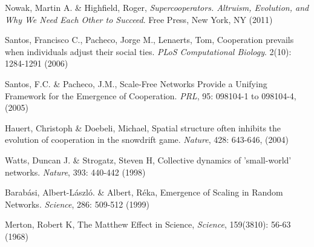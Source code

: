 \begin{thebibliography}{50}
 Nowak, Martin A. \& Highfield, Roger,
  \textit{Supercooperators. Altruism, Evolution, and Why We Need Each
    Other to Succeed}. Free Press, New York, NY  (2011)

 Santos, Francisco C., Pacheco, Jorge M., Lenaerts, Tom, Cooperation prevails when individuals adjust their social ties. \textit{PLoS Computational Biology}. 2(10): 1284-1291 (2006)

 Santos, F.C. \& Pacheco, J.M., Scale-Free
  Networks Provide a Unifying Framework for the Emergence of
  Cooperation. \textit{PRL}, 95: 098104-1 to 098104-4, (2005) 

 Hauert, Christoph \& Doebeli, Michael, Spatial
  structure often inhibits the evolution of cooperation in the
  snowdrift game. \textit{Nature}, 428: 643-646,  (2004)
  
 Watts, Duncan J. \& Strogatz, Steven H, Collective dynamics
  of 'small-world' networks. \textit{Nature}, 393: 440-442 (1998)

 Barab\'asi, Albert-L\'aszl\'o. \& Albert, R\'eka, Emergence of
  Scaling in Random Networks. \textit{Science}, 286: 509-512 (1999)



 Merton, Robert K, The Matthew Effect in Science, \textit{Science}, 159(3810): 56-63 (1968)


%
\end{thebibliography}



